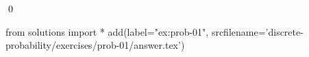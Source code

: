 
\begin{ex} 
  \label{ex:prob-01}
  
  \qed
\end{ex} 
\begin{python0}
from solutions import *
add(label="ex:prob-01",
    srcfilename='discrete-probability/exercises/prob-01/answer.tex') 
\end{python0}
